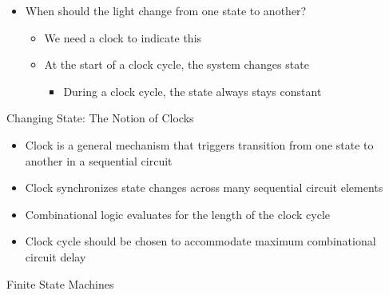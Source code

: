 \begin{itemize}
    \item When should the light change from one state to another?

      \begin{itemize}

        \item We need a clock to indicate this

        \item At the start of a clock cycle, the system changes state

          \begin{itemize}

            \item During a clock cycle, the state always stays constant

          \end{itemize}

      \end{itemize}

  \end{itemize}

\item Changing State: The Notion of Clocks

  \begin{itemize}

    \item Clock is a general mechanism that triggers transition from one state to another in a sequential circuit

    \item Clock synchronizes state changes across many sequential circuit elements

    \item Combinational logic evaluates for the length of the clock cycle

    \item Clock cycle should be chosen to accommodate maximum combinational circuit delay

  \end{itemize}

\item Finite State Machines

